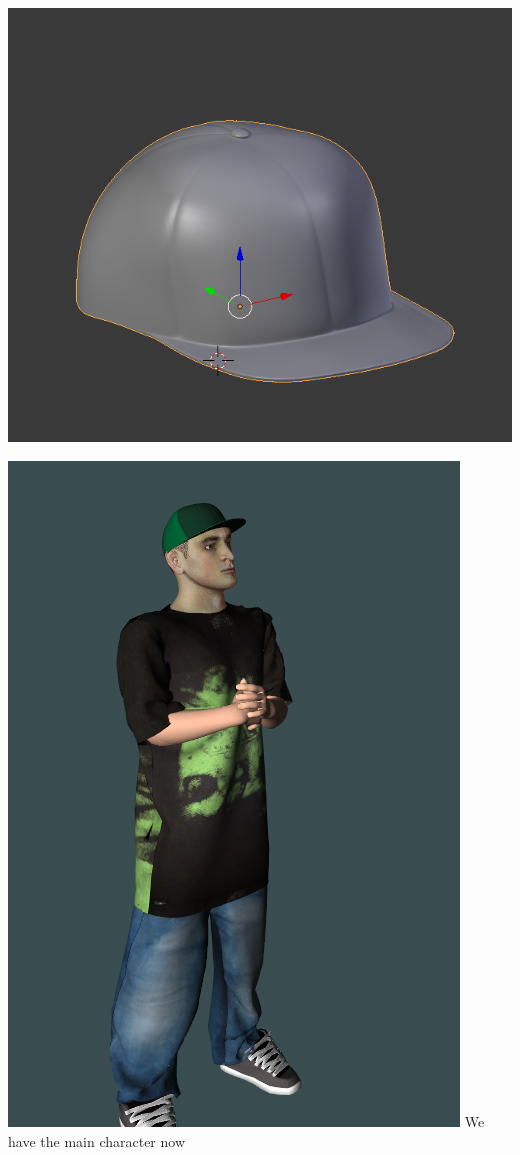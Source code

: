 \documentclass{article}
\begin{document}
  \includegraphics[width=\textwidth]{8.png}

  \includegraphics[width=\textwidth]{9.png}
  We have the main character now
\end{document}
